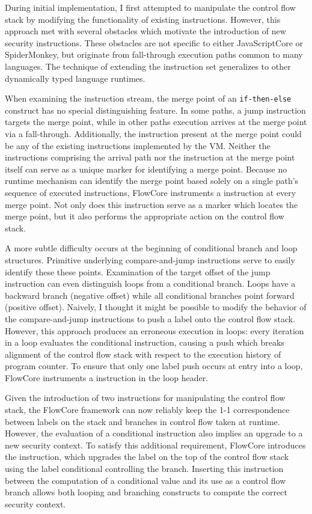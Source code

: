 During initial implementation, I first attempted to manipulate the control flow stack by modifying the functionality of existing instructions.
However, this approach met with several obstacles which motivate the introduction of new security instructions.
These obstacles are not specific to either JavaScriptCore or SpiderMonkey, but originate from fall-through execution paths common to many languages.
The technique of extending the instruction set generalizes to other dynamically typed language runtimes.

When examining the instruction stream, the merge point of an \texttt{if-then-else} construct has no special distinguishing feature.
In some paths, a jump instruction targets the merge point, while in other paths execution arrives at the merge point via a fall-through.
Additionally, the instruction present at the merge point could be any of the existing instructions implemented by the VM.
Neither the instructions comprising the arrival path nor the instruction at the merge point itself can serve as a unique marker for identifying a merge point.
Because no runtime mechanism can identify the merge point based solely on a single path's sequence of executed instructions, FlowCore instruments a \popj instruction at every merge point.
Not only does this instruction serve as a marker which locates the merge point, but it also performs the appropriate action on the control flow stack.

A more subtle difficulty occurs at the beginning of conditional branch and loop structures.
Primitive underlying compare-and-jump instructions serve to easily identify these these points.
Examination of the target offset of the jump instruction can even distinguish loops from a conditional branch.
Loops have a backward branch (negative offset) while all conditional branches point forward (positive offset).
Naively, I thought it might be possible to modify the behavior of the compare-and-jump instructions to push a label onto the control flow stack.
However, this approach produces an erroneous execution in loops: every iteration in a loop evaluates the conditional instruction, causing a push which breaks alignment of the control flow stack with respect to the execution history of program counter.
To ensure that only one label push occurs at entry into a loop, FlowCore instruments a \dup instruction in the loop header.

Given the introduction of two instructions for manipulating the control flow stack, the FlowCore framework can now reliably keep the 1-1 correspondence between labels on the stack and branches in control flow taken at runtime.
However, the evaluation of a conditional instruction also implies an upgrade to a new security context.
To satisfy this additional requirement, FlowCore introduces the \join instruction, which upgrades the label on the top of the control flow stack using the label conditional controlling the branch.
Inserting this instruction between the computation of a conditional value and its use as a control flow branch allows both looping and branching constructs to compute the correct security context.

